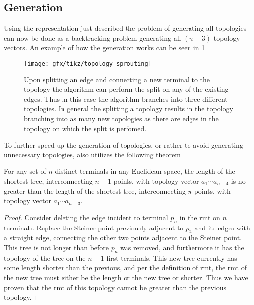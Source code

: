 \subsection{Generation}
\label{sec:generation}

Using the representation just described the problem of generating all topologies
can now be done as a backtracking problem generating all $(n-3)$-topology
vectors. An example of how the generation works can be seen in
\cref{fig:topology-sprouting}

\begin{figure}[htbp]
  \centering
  \texttt{[image: gfx/tikz/topology-sprouting]}
  \caption[Splitting of an edge]{Upon splitting an edge and connecting a new
    terminal to the topology the algorithm can perform the split on any of the
    existing edges. Thus in this case the algorithm branches into three
    different topologies. In general the splitting a topology results in the topology
    branching into as many new topologies as there are edges in the topology on which
    the split is perfomed.\label{fig:topology-sprouting}}
\end{figure}

To further speed up the generation of topologies, or rather to avoid generating
unnecessary topologies, \citeauthor{smith1992} also utilizes the following theorem
%
\begin{theorem}
  For any set of $n$ distinct terminals in any Euclidean space, the length of
  the shortest tree, interconnecting $n-1$ points, with topology vector
  $a_1 \cdots a_{n-4}$ is no greater than the length of the shortest tree,
  interconnecting $n$ points, with topology vector $a_1 \cdots a_{n-3}$.
\end{theorem}
%
\begin{proof}
  Consider deleting the edge incident to terminal $p_n$ in the \ac{rmt} on $n$
  terminals. Replace the Steiner point previously adjacent to $p_n$ and its
  edges with a straight edge, connecting the other two points adjacent to the
  Steiner point. This tree is not longer than before $p_n$ was removed, and
  furthermore it has the topology of the tree on the $n-1$ first terminals. This
  new tree currently has some length shorter than the previous, and per the
  definition of \ac{rmt}, the \ac{rmt} of the new tree must either be the length
  or the new tree or shorter. Thus we have proven that the \ac{rmt} of this
  topology cannot be greater than the previous topology.
\end{proof}

